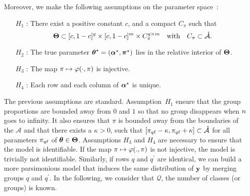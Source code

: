 \documentclass[]{imsart}
\newcommand{\1}{\mathds{1}}
\numberwithin{equation}{section}
\theoremstyle{plain}
\theoremstyle{remark}
\newtheorem{rem}[thm]{Remark}
\begin{document}
Moreover, we make the following assumptions on the parameter space~:
\begin{enumerate}
\item[$H_1$]: There exist a positive constant $c$, and a compact $C_\pi$ such that 
  \begin{equation*}
    \bTheta \subset [c, 1-c]^{\g} \times  [c, 1-c]^{\m} \times C_{\pi}^{\g \times \m} \quad \text{with} \quad C_\pi \subset \mathring{\mathcal{A}}.
  \end{equation*}
\item[$H_2$]: The true parameter $\boldsymbol{\theta}^\star = (\boldsymbol{\alpha}^\star, \boldsymbol{\pi}^\star)$ lies in the relative interior of $\boldsymbol{\Theta}$.
\item[$H_3$]: The map $\pi \mapsto \varphi(\cdot, \pi)$ is injective.
\item[$H_4$]: 
Each row and each column of $\boldsymbol{\alpha}^\star$ is unique.
\end{enumerate}

The previous assumptions are standard. Assumption~$H_1$ ensure that the group proportions are bounded away from $0$ and $1$ so that no group disappears when $n$ goes to infinity. It also ensures that $\pi$ is bounded away from the boundaries of the $\mathcal{A}$ and that there exists a $\kappa>0$, such that $[\pi_{q \ell} - \kappa, \pi_{q \ell} + \kappa] \subset \mathring{\mathcal{A}}$ for all parameters $\pi_{q \ell}$ of $\boldsymbol{\theta} \in \boldsymbol{\Theta}$. Assumptions $H_3$ and $H_4$ are necessary to ensure that the model is identifiable. If the map $\pi \mapsto \varphi(., \pi)$ is not injective, the model is trivially not identifiable. Similarly, if rows $q$ and $q^\prime$ are identical, we can build a more parsimonious model that induces the same distribution of $\mathbf{y}$ by merging groups $q$ and $q^\prime$. In the following, we  consider that $\mathcal{Q}$, the number of classes (or groups) is known.
\end{document}
